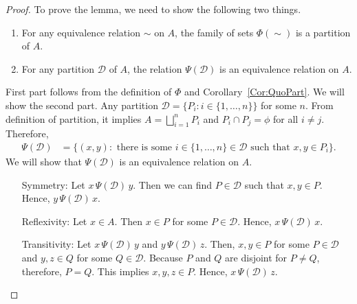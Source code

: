 \documentclass[a4paper,english,12pt]{article}
\begin{document}
\begin{proof}
	To prove the lemma, we need to show the following two things.
	\begin{enumerate}
		\item For any equivalence relation $\sim$ on $A$, the family of sets $\Phi(\sim)$ is a partition of $A$.
		\item For any partition $\mathcal{D}$ of $A$, the relation $\Psi(\mathcal{D})$ is an equivalence relation on $A$.
	\end{enumerate}
	First part follows from the definition of $\Phi$ and Corollary~\ref{Cor:QuoPart}. We will show the second part. Any partition $\mathcal{D} = \{P_i : i \in \{1, \ldots, n\}\}$ for some $n$. From definition of partition, it implies $A = \bigsqcup\limits_{i=1}^{n}P_i$ and $P_i\cap P_j = \phi$ for all $i \neq j$. Therefore, 
\begin{align*}
	\Psi (\mathcal{D}) &= \{(x,y): \text{ there is some } i \in \{1,\ldots,n\} \in \mathcal{D} \text{ such that } x,y \in P_i\}.
\end{align*}
We will show that $\Psi (\mathcal{D})$ is an equivalence relation on $A$.
\begin{itemize}
	\item[Symmetry:] Let $x\, \Psi(\mathcal{D})\, y$. Then we can find $P \in \mathcal{D}$ such that $x,y \in P$. Hence, $y\, \Psi(\mathcal{D})\, x$.
	\item[Reflexivity:] Let $x \in A$. Then $x \in P$ for some $P \in \mathcal{D}$. Hence, $x\, \Psi(\mathcal{D})\, x$.
	\item[Transitivity:] Let $x\, \Psi(\mathcal{D})\, y$ and $y\, \Psi(\mathcal{D})\, z$. Then, $x,y \in P$ for some $P \in \mathcal{D}$ and $y,z \in Q$ for some $Q \in \mathcal{D}$. Because $P$ and $Q$ are disjoint for $P \neq Q$, therefore, $P = Q$. This implies $x,y,z \in P$. Hence, $x\, \Psi(\mathcal{D})\, z$.
\end{itemize}
\end{proof}
\end{document}
